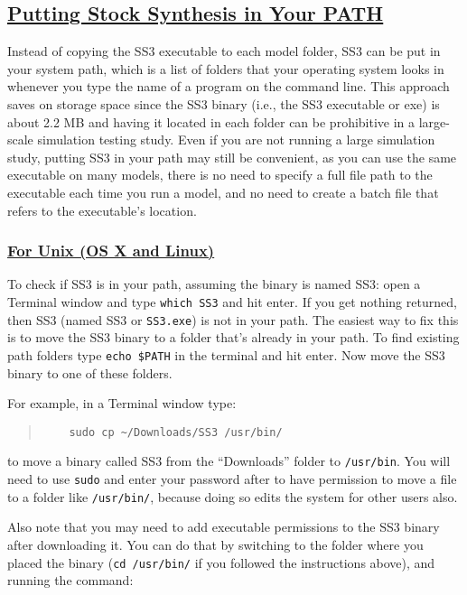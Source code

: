 \hypertarget{SS3inPath}{}
\subsection[Putting Stock Synthesis in Your PATH]{\protect\hyperlink{SS3inPath}{Putting Stock Synthesis in Your PATH}}
Instead of copying the SS3 executable to each model folder, SS3 can be put in your system path, which is a list of folders that your operating system looks in whenever you type the name of a program on the command line. This approach saves on storage space since the SS3 binary (i.e., the SS3 executable or exe) is about 2.2 MB and having it located in each folder can be prohibitive in a large-scale simulation testing study. Even if you are not running a large simulation study, putting SS3 in your path may still be convenient, as you can use the same executable on many models, there is no need to specify a full file path to the executable each time you run a model, and no need to create a batch file that refers to the executable's location.

\hypertarget{Unix}{}
\subsubsection[For Unix (OS X and Linux)]{\protect\hyperlink{Unix}{For Unix (OS X and Linux)}}
To check if SS3 is in your path, assuming the binary is named SS3: open a Terminal window and type \texttt{which SS3} and hit enter. If you get nothing returned, then SS3 (named SS3 or \texttt{SS3.exe}) is not in your path. The easiest way to fix this is to move the SS3 binary to a folder that's already in your path. To find existing path folders type \texttt{echo \$PATH} in the terminal and hit enter. Now move the SS3 binary to one of these folders.

For example, in a Terminal window type:

\begin{quote}
   \begin{verbatim}
    sudo cp ~/Downloads/SS3 /usr/bin/
  \end{verbatim}
\end{quote}

to move a binary called SS3 from the ``Downloads'' folder to \texttt{/usr/bin}. You will need to use \texttt{sudo} and enter your password after to have permission to move a file to a folder like \texttt{/usr/bin/}, because doing so edits the system for other users also.

Also note that you may need to add executable permissions to the SS3 binary after downloading it. You can do that by switching to the folder where you placed the binary
(\texttt{cd /usr/bin/} if you followed the instructions above), and running the command:

